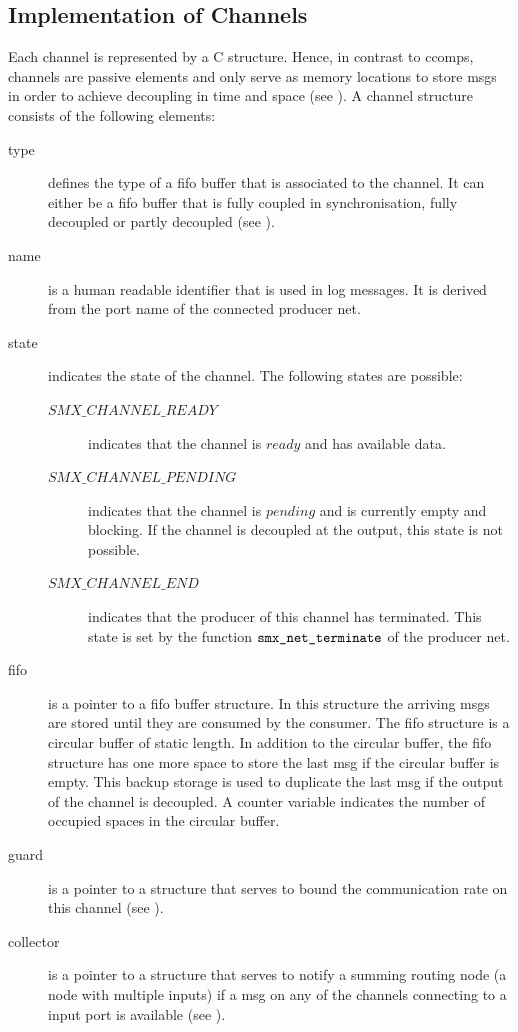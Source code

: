 \subsection{Implementation of Channels}
\label{sect_tool_rts_channel}
Each channel is represented by a C structure.
Hence, in contrast to \glspl*{ccomp}, channels are passive elements and only serve as memory locations to store \glspl*{msg} in order to achieve decoupling in time and space (see \Sect{\ref{sect_cci_decoupling}}).
A channel structure consists of the following elements:
\begin{description}
    \item[type] defines the type of a \gls{fifo} buffer that is associated to the channel.
        It can either be a \gls{fifo} buffer that is fully coupled in synchronisation, fully decoupled or partly decoupled (see \Sect{\ref{sect_cci_decoupling_sync}}).
    \item[name] is a human readable identifier that is used in log messages.
        It is derived from the port name of the connected producer net.
    \item[state] indicates the state of the channel.
        The following states are possible:
        \begin{description}
            \item[$\mathit{SMX\_CHANNEL\_READY}$] indicates that the channel is $ready$ and has available data.
            \item[$\mathit{SMX\_CHANNEL\_PENDING}$] indicates that the channel is $pending$ and is currently empty and blocking.
                If the channel is decoupled at the output, this state is not possible.
            \item[$\mathit{SMX\_CHANNEL\_END}$] indicates that the producer of this channel has terminated.
                This state is set by the function $\textnormal{\tt smx\_net\_terminate}$ of the producer net.
        \end{description}
    \item[fifo] is a pointer to a \gls{fifo} buffer structure.
        In this structure the arriving \glspl*{msg} are stored until they are consumed by the consumer.
        The \gls{fifo} structure is a circular buffer of static length.
        In addition to the circular buffer, the \gls{fifo} structure has one more space to store the last \gls*{msg} if the circular buffer is empty.
        This backup storage is used to duplicate the last \gls*{msg} if the output of the channel is decoupled.
        A counter variable indicates the number of occupied spaces in the circular buffer.
    \item[guard] is a pointer to a structure that serves to bound the communication rate on this channel (see \SSect{\ref{sect_tool_rts_ch_tb}}).
    \item[collector] is a pointer to a structure that serves to notify a summing routing node (a node with multiple inputs) if a \gls*{msg} on any of the channels connecting to a input port is available (see \SSect{\ref{sect_tool_rts_ch_cflow}}).
\end{description}

